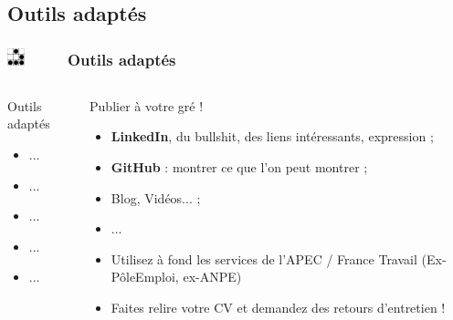 \documentclass[slidetop,11pt]{beamer}
\def\sectionPartVb{Outils adapt{\'e}s}
\def\moreInFrameTitle{\includegraphics[height=0.5cm]{img/logo_glider.png}~~~~~}
\begin{document}
\subsection{\sectionPartVb}
\begin{frame}
	\frametitle{\moreInFrameTitle \sectionPartVb}
	\begin{columns}[T]
	\begin{column}[T]{5.50cm}
		\begin{beamerboxesrounded}	[lower=substructureDE, %
		 				 upper=block title DE,%
						 shadow=true]%
		       {\sectionPartVb}
			\begin{itemize}
				\item ...
				\item ...
				\item ... 
				\item ... 
				\item ... 
			\end{itemize}
		\end{beamerboxesrounded}
	\end{column}
	\begin{column}[T]{5.50cm}
		\begin{beamerboxesrounded}	[lower=substructureUN, %
		 				 upper=block title UN,%
						 shadow=true]%
		       {Publier {\`a} votre gr{\'e} !}
			\begin{itemize}
				\item \textbf{LinkedIn}, du bullshit, des liens int{\'e}ressants, expression ; 
				\item \textbf{GitHub} : montrer ce que l'on peut montrer ; 
				\item Blog, Vid{\'e}os... ; 
				\item ... 
				\item Utilisez {\`a} fond les services de l'APEC / France Travail (Ex-P{\^o}leEmploi, ex-ANPE)
				\item Faites relire votre CV et demandez des retours d'entretien !
			\end{itemize}
		\end{beamerboxesrounded}
	\end{column}
	\end{columns}
\end{frame}
\end{document}
